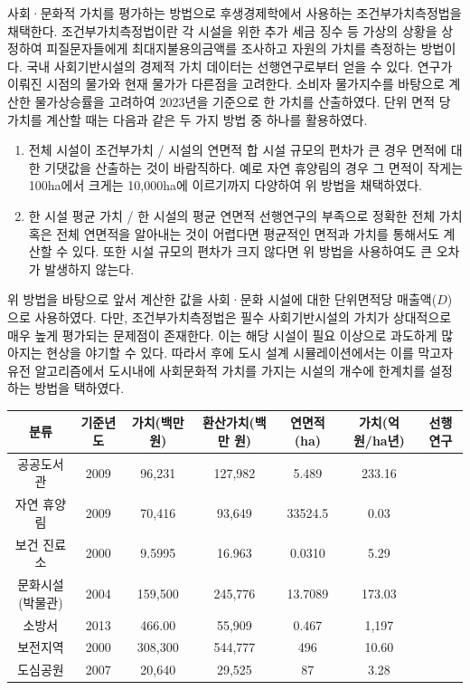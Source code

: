 \documentclass[10pt]{article}
\begin{document}
\begin{multicols}{2}
사회\!·\!문화적 가치를 평가하는 방법으로 후생경제학에서 사용하는 조건부가치측정법을 채택한다. 조건부가치측정법이란 각 시설을 위한 추가 세금 징수 등 가상의 상황을 상정하여 피질문자들에게 최대지불용의금액를 조사하고 자원의 가치를 측정하는 방법이다. 국내 사회기반시설의 경제적 가치 데이터는 선행연구로부터 얻을 수 있다. 연구가 이뤄진 시점의 물가와 현재 물가가 다른점을 고려한다. 소비자 물가지수를 바탕으로 계산한 물가상승률을 고려하여 2023년을 기준으로 한 가치를 산출하였다. 단위 면적 당 가치를 계산할 때는 다음과 같은 두 가지 방법 중 하나를 활용하였다.
\begin{enumerate}
    \item 전체 시설이 조건부가치 / 시설의 연면적 합 
    시설 규모의 편차가 큰 경우 면적에 대한 기댓값을 산출하는 것이 바람직하다. 예로 자연 휴양림의 경우 그 면적이 작게는 100ha에서 크게는 10,000ha에 이르기까지 다양하여 위 방법을 채택하였다.
    \item 한 시설 평균 가치 / 한 시설의 평균 연면적
    선행연구의 부족으로 정확한 전체 가치 혹은 전체 연면적을 알아내는 것이 어렵다면 평균적인 면적과 가치를 통해서도 계산할 수 있다. 또한 시설 규모의 편차가 크지 않다면 위 방법을 사용하여도 큰 오차가 발생하지 않는다.
\end{enumerate}
위 방법을 바탕으로 앞서 계산한 값을 사회·문화 시설에 대한 단위면적당 매출액($D$)으로 사용하였다. 다만, 조건부가치측정법은 필수 사회기반시설의 가치가 상대적으로 매우 높게 평가되는 문제점이 존재한다. 이는 해당 시설이 필요 이상으로 과도하게 많아지는 현상을 야기할 수 있다. 따라서 후에 도시 설계 시뮬레이션에서는 이를 막고자 유전 알고리즘에서 도시내에 사회문화적 가치를 가지는 시설의 개수에 한계치를 설정하는 방법을 택하였다.
\begin{table}
\small
\centering
\renewcommand{\arraystretch}{1.4}
\begin{tabular}{cccccccl}
\toprule
{분류} & {기준년도} & {가치(백만 원)} & {환산가치(백만 원)} & {연면적(ha)} & {가치(억 원/ha년)} & \multicolumn{2}{c}{{선행 연구}} \\
\midrule
{공공도서관} & {2009} & {96,231} & {127,982} & {5.489} & {233.16} & \multicolumn{2}{c}{{\cite{culture2009}} \cite{ART001781846}} \\
{자연 휴양림} & {2009} & {70,416} & {93,649} & {33524.5} & {0.03} & \multicolumn{2}{c}{{\cite{kang2009}}} \\
{보건 진료소} & {2000} & {9.5995} & {16.963} & {0.0310} & {5.29} & \multicolumn{2}{c}{{\cite{park2001}}} \\
{문화시설(박물관)} & {2004} & {159,500} & {245,776} & {13.7089} & {173.03} & \multicolumn{2}{c}{{\cite{park2004}}} \\
{소방서} & {2013} & {466.00} & {55,909} & {0.467} & {1,197} & \multicolumn{2}{c}{{\cite{류태창2013cvm}}} \\
{보전지역} & {2000} & {308,300} & {544,777} & {496} & {10.60} & \multicolumn{2}{c}{{\cite{kim2021} \cite{seoul-env-news}}} \\
{도심공원} & {2007} & {20,640} & {29,525} & {87} & {3.28} & \multicolumn{2}{c}{{\cite{kim2007}}} \\
\bottomrule
\end{tabular}
\end{table}


\end{multicols}
\end{document}
